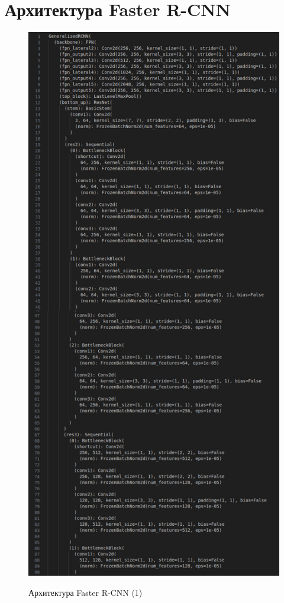 \chapter{Архитектура Faster R-CNN} \label{appendix1}							%

\begin{figure}[h!]
	\begin{center}
	\includegraphics [scale=0.35]{my_folder/images/arch12}
	\label{fig:arch12}
	\end{center}
	\caption{Архитектура Faster R-CNN (1)}
\end{figure}
